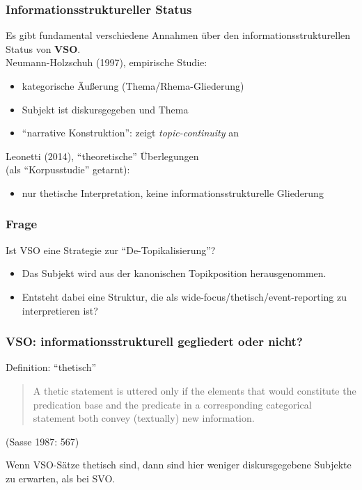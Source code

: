 \begin{frame}
\frametitle{Informationsstruktureller Status}

Es gibt fundamental verschiedene Annahmen über den informationsstrukturellen Status von \textbf{VSO}.\\[.3cm]


Neumann-Holzschuh (1997), empirische Studie:\\
\begin{itemize}
\item kategorische Äußerung (Thema/Rhema-Gliederung)
\item Subjekt ist diskursgegeben und Thema
\item ``narrative Konstruktion'': zeigt \textit{topic-continuity} an
\end{itemize}

\pause
\vspace{.2cm}

Leonetti (2014), ``theoretische'' Überlegungen\\
(als ``Korpusstudie'' getarnt): 

 \begin{itemize}
  \item nur thetische Interpretation, keine informationsstrukturelle Gliederung
 \end{itemize}

\end{frame}


\begin{frame}
\frametitle{Frage}

Ist VSO eine Strategie zur ``De-Topikalisierung''?

    \begin{itemize}
    \item Das Subjekt wird aus der kanonischen Topikposition herausgenommen.
    \item Entsteht dabei eine Struktur, die als wide-focus/thetisch/event-reporting zu interpretieren ist?
    \end{itemize}
	
\end{frame}


\begin{frame}
 \frametitle{VSO: informationsstrukturell gegliedert oder nicht?}

Definition: ``thetisch'' 
\begin{quote}
   A thetic statement is uttered only if the elements that would constitute the predication base and the predicate in a corresponding categorical statement both convey (textually) new information.
\end{quote} (Sasse 1987: 567)

\pause
\vspace{.2cm}

Wenn VSO-Sätze thetisch sind, dann sind hier weniger diskursgegebene Subjekte zu erwarten, als bei SVO.

\end{frame}



